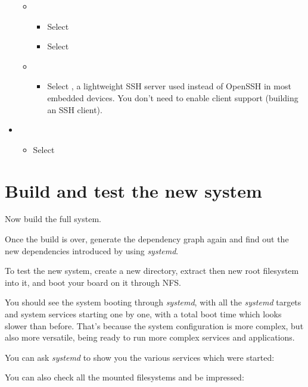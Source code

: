 \begin{itemize}
\begin{itemize}
\begin{itemize}
    \end{itemize}
  \item {}
    \begin{itemize}
    \item Select 
    \item Select 
    \end{itemize}
  \item {}
    \begin{itemize}
    \item Select , a lightweight SSH server used instead
          of OpenSSH in most embedded devices. You don't need to enable
          client support (building an SSH client).
    \end{itemize}
  \end{itemize}
\item {}
  \begin{itemize}
     \item Select 
  \end{itemize}
\end{itemize}

\section{Build and test the new system}

Now build the full system.

Once the build is over, generate the dependency graph again and find out
the new dependencies introduced by using {\em systemd}.

To test the new system, create a new  directory, extract
then new root filesystem into it, and boot your board on it through NFS.

You should see the system booting through {\em systemd}, with all the
{\em systemd} targets and system services starting one by one, with a
total boot time which looks slower than before. That's because the
system configuration is more complex, but also more versatile, being
ready to run more complex services and applications.

You can ask {\em systemd} to show you the various services which were
started:


You can also check all the mounted filesystems and be impressed:


